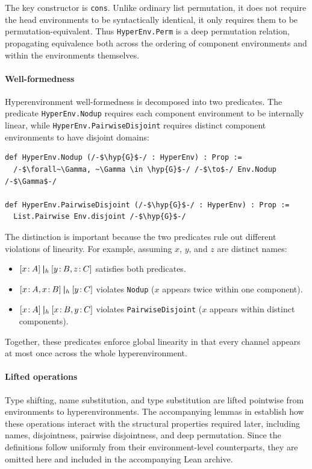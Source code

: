 The key constructor is \texttt{cons}. Unlike ordinary list permutation, it does not require the head environments to be syntactically identical, it only requires them to be permutation-equivalent. Thus \texttt{HyperEnv.Perm} is a deep permutation relation, propagating equivalence both across the ordering of component environments and within the environments themselves.

\paragraph{Well-formedness} Hyperenvironment well-formedness is decomposed into two predicates. The predicate \texttt{HyperEnv.Nodup} requires each component environment to be internally linear, while \texttt{HyperEnv.PairwiseDisjoint} requires distinct component environments to have disjoint domains:

\begin{lstlisting}[language=Lean4]
def HyperEnv.Nodup (/-$\hyp{G}$-/ : HyperEnv) : Prop :=
  /-$\forall~\Gamma, ~\Gamma \in \hyp{G}$-/ /-$\to$-/ Env.Nodup /-$\Gamma$-/

def HyperEnv.PairwiseDisjoint (/-$\hyp{G}$-/ : HyperEnv) : Prop :=
  List.Pairwise Env.disjoint /-$\hyp{G}$-/
\end{lstlisting}

The distinction is important because the two predicates rule out different violations of linearity. For example, assuming $x$, $y$, and $z$ are distinct names:

\begin{highlight}  
  \begin{itemize}
    \item $[x\colon\mspace{-2mu}A]\mathbin{\boldsymbol{|}}_h[y\colon\mspace{-2mu}B, z\colon\mspace{-2mu}C]$ satisfies both predicates.
    \item $[x\colon\mspace{-2mu}A, x\colon\mspace{-2mu}B]\mathbin{\boldsymbol{|}}_h[y\colon\mspace{-2mu}C]$ violates \texttt{Nodup} ($x$ appears twice within one component).
    \item $[x\colon\mspace{-2mu}A]\mathbin{\boldsymbol{|}}_h[x\colon\mspace{-2mu}B, y\colon\mspace{-2mu}C]$ violates \texttt{PairwiseDisjoint} ($x$ appears within distinct components).
  \end{itemize}
\end{highlight}
  
Together, these predicates enforce global linearity in that every channel appears at most once across the whole hyperenvironment.

\paragraph{Lifted operations} Type shifting, name substitution, and type substitution are lifted pointwise from environments to hyperenvironments. The accompanying lemmas in  establish how these operations interact with the structural properties required later, including names, disjointness, pairwise disjointness, and deep permutation. Since the definitions follow uniformly from their environment-level counterparts, they are omitted here and included in the accompanying Lean archive.

